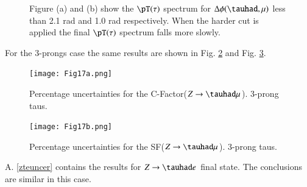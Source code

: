 \begin{figure}[htbp]
	\centering
	\caption{Figure (a) and (b) show the  $\pT(\tau)$ spectrum for  $\Delta\phi(\tauhad ,\mu)$ less than 2.1 rad and 1.0 rad respectively. When the harder cut is applied the final $\pT(\tau)$ spectrum falls more slowly.}
	\label{Fig18}
\end{figure}

For the 3-prongs case the same results are shown in Fig. \ref{Fig17a} and Fig. \ref{Fig17b}.

\begin{figure}[htbp]
	\centering
	\texttt{[image: Fig17a.png]}
	\caption{Percentage uncertainties for the C-Factor($Z\to\tauhad\mu$). 3-prong taus.}
	\label{Fig17a}
\end{figure}
\begin{figure}[htbp]
	\centering
	\texttt{[image: Fig17b.png]}
	\caption{Percentage uncertainties for the SF($Z\to\tauhad\mu$). 3-prong taus.}
	\label{Fig17b}
\end{figure}

A. \ref{zteuncer} contains the results for $Z\to\tauhad e$ final state. The conclusions are similar in this case.


